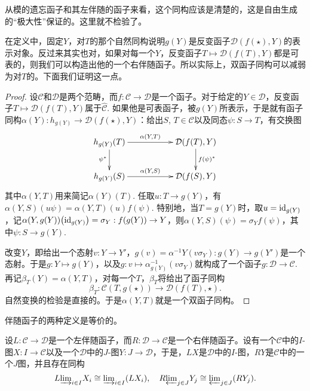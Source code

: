从模的遗忘函子和其左伴随的函子来看，这个同构应该是清楚的，这是自由生成的“极大性”保证的。这里就不检验了。

在定义中，固定$Y$，对$T$的那个自然同构说明$g(Y)$是反变函子$\mathcal{D}(f(\star),Y)$的表示对象。反过来其实也对，如果对每一个$Y$，反变函子$T\mapsto {\mathcal{D}}(f(T),Y)$都是可表的，则我们可以构造出他的一个右伴随函子。所以实际上，双函子同构可以减弱为对$T$的。下面我们证明这一点。

\begin{proof} 
	设$\mathcal{C}$和$\mathcal{D}$是两个范畴，而$f:\mathcal{C}\to \mathcal{D}$是一个函子。对于给定的$Y\in\mathcal{D}$，反变函子$T\mapsto {\mathcal{D}}(f(T),Y)$属于$\hat{\mathcal{C}}$. 如果他是可表函子，被$g(Y)$所表示，于是就有函子同构$\alpha(Y):h_{g(Y)}\to {\mathcal{D}}(f(\star),Y)$：给出$S$, $T\in \mathcal{C}$以及同态$\psi:S\to T$，有交换图
	\[
	\begin{xy}
		\xymatrix{
			h_{g(Y)}(T)\ar[rr]^-{\alpha(Y,T)} \ar[d]_{\psi^*}&&{\mathcal{D}}(f(T),Y) \ar[d]^{f(\psi)^*}\\
			h_{g(Y)}(S)\ar[rr]^-{\alpha(Y,S)}&&{\mathcal{D}}(f(S),Y)
		}
	\end{xy}
	\]
	其中$\alpha(Y,T)$用来简记$\alpha(Y)(T)$. 任取$u:T\to {g(Y)}$，有$\alpha(Y,S)(u\psi)=\alpha(Y,T)(u)f(\psi)$. 特别地，当$T=g(Y)$时，取$u=\operatorname{id}_{g(Y)}$，记$\alpha(Y,g(Y))\bigl(\operatorname{id}_{g(Y)}\bigr)=\sigma_Y:f(g(Y))\to Y$，则$\alpha(Y,S)(\psi)=\sigma_Y f(\psi)$，其中$\psi:S\to g(Y)$.

	改变$Y$，即给出一个态射$v:Y\to Y'$，$g(v)=\alpha^{-1}{Y}\left(v\sigma_Y\right):g(Y)\to g(Y')$是一个态射。于是$g:Y\mapsto g(Y)$，以及$g:v\mapsto \alpha^{-1}_{g(Y)}\left(v\sigma_Y\right)$就构成了一个函子$g:\mathcal{D}\to \mathcal{C}$. 再记$\beta_T(Y)=\alpha(Y,T)$，对每一个$T$，$\beta_T$将给出了函子同构
	\[
		\beta_T:\mathcal{C}(T,g(\star))\to \mathcal{D}(f(T),\star).
	\]
	自然变换的检验是直接的。于是$\alpha(Y,T)$就是一个双函子同构。
\end{proof}

\begin{pro}
伴随函子的两种定义是等价的。
\end{pro}

\begin{pro}
设$L:\mathcal{C}\to \mathcal{D}$是一个左伴随函子，而$R:\mathcal{D}\to \mathcal{C}$是一个右伴随函子。设有一个$\mathcal{C}$中的$I$-图$X:I\to \mathcal{C}$以及一个$\mathcal{D}$中的$J$-图$Y:J\to \mathcal{D}$，于是，$LX$是$\mathcal{D}$中的$I$-图，$RY$是$\mathcal{C}$中的一个$J$图，并且存在同构
\[
	L{\varinjlim}_{i\in I} X_i\cong {\varinjlim}_{i\in I} (LX_i),\quad
	R{\varprojlim}_{j\in J} Y_j\cong {\varprojlim}_{j\in J} (RY_j).
\]
\end{pro}

